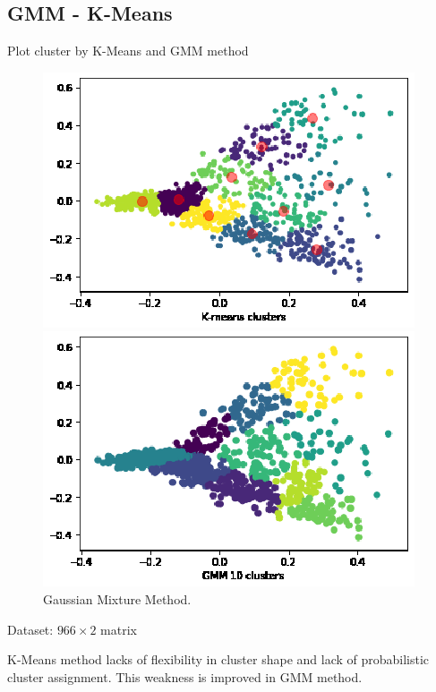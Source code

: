 \documentclass[9pt]{beamer}
\begin{document}
\subsection{GMM - K-Means}
\begin{frame}{Plot cluster by K-Means and GMM method}
\begin{figure}[!t]
  \centering
  \begin{minipage}[b]{0.45\textwidth}
    \includegraphics[width=1\columnwidth]{6_kmeans_2dim.eps}
    \caption{ K-Means Method.}
  \end{minipage}
  \hfill
  \begin{minipage}[b]{0.45\textwidth}
    \includegraphics[width=1\columnwidth]{7_gmm_2dim.eps}
    \caption{Gaussian Mixture Method.\label{gmm}}
  \end{minipage}
\end{figure}

    \item Dataset: $966\times2$ matrix 
    \item K-Means method lacks of flexibility in cluster shape and lack of probabilistic cluster assignment. This weakness is improved in GMM method.
\end{frame}
\end{document}
